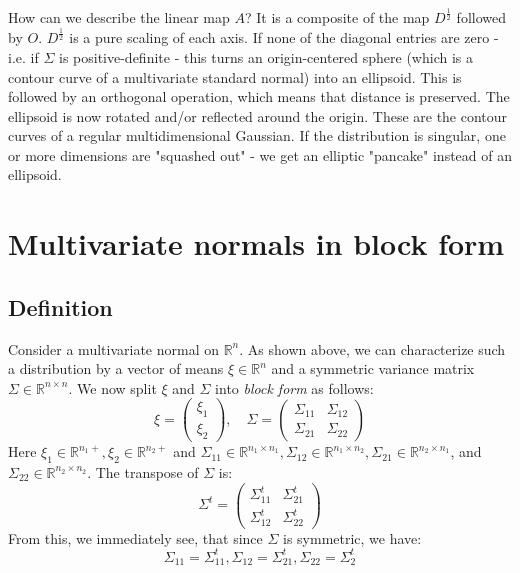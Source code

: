 \documentclass[12pt, a4paper]{article}
\numberwithin{equation}{section}
\begin{document}
How can we describe the linear map $A$? It is a composite of the map $D^{\frac{1}{2}}$ followed by $O$. $D^{\frac{1}{2}}$ is a pure scaling of each axis. If none of the diagonal entries are zero - i.e. if $\Sigma$ is positive-definite - this turns an origin-centered sphere (which is a contour curve of a multivariate standard normal) into an ellipsoid. This is followed by an orthogonal operation, which means that distance is preserved. The ellipsoid is now rotated and/or reflected around the origin. These are the contour curves of a regular multidimensional Gaussian. If the distribution is singular, one or more dimensions are "squashed out" - we get an elliptic "pancake" instead of an ellipsoid.

\section{Multivariate normals in block form}

\subsection{Definition}
Consider a multivariate normal on $\mathbb{R}^n$. As shown above, we can characterize such a distribution by a vector of means $\xi\in\mathbb{R}^n$ and a symmetric variance matrix $\Sigma\in\mathbb{R}^{n\times n}$. We now split $\xi$ and $\Sigma$ into \textit{block form} as follows:
\begin{equation}
\xi=
\begin{pmatrix}
\xi_1 \\ \xi_2
\end{pmatrix},\quad
\Sigma=
\begin{pmatrix}
\Sigma_{11} & \Sigma_{12} \\
\Sigma_{21} & \Sigma_{22}
\end{pmatrix}
\end{equation}
Here $\xi_1\in\mathbb{R}^{n_1+}, \xi_2\in\mathbb{R}^{n_2+}$ and $\Sigma_{11}\in\mathbb{R}^{n_1\times n_1}, \Sigma_{12}\in\mathbb{R}^{n_1\times n_2}, \Sigma_{21}\in\mathbb{R}^{n_2\times n_1}$, and $\Sigma_{22}\in\mathbb{R}^{n_2\times n_2}$. The transpose of $\Sigma$ is:
\begin{equation}
\Sigma^t=
\begin{pmatrix}
\Sigma_{11}^t & \Sigma_{21}^t \\
\Sigma_{12}^t & \Sigma_{22}^t
\end{pmatrix}
\end{equation}
From this, we immediately see, that since $\Sigma$ is symmetric, we have:
\begin{equation}
\Sigma_{11}=\Sigma_{11}^t, \Sigma_{12}=\Sigma_{21}^t, \Sigma_{22}=\Sigma_{2}^t
\end{equation}
\end{document}
